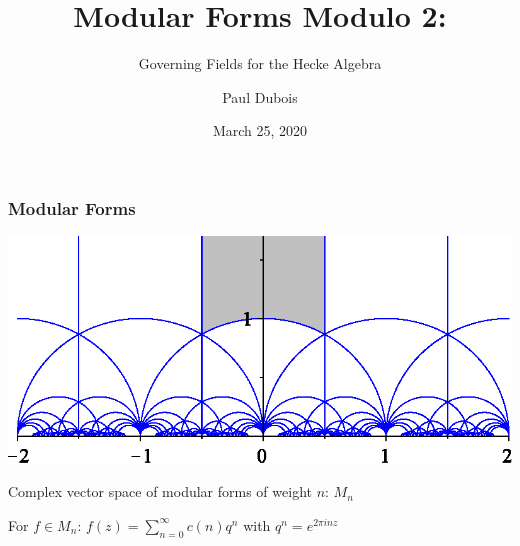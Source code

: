 \documentclass[12pt]{beamer}
\begin{document}
	\author{Paul Dubois}
	\title{Modular Forms Modulo 2:}
	\subtitle{Governing Fields for the Hecke Algebra}
	\date{March 25, 2020}
	\subject{Mathematics}
	\begin{frame}[plain]
		\maketitle
	\end{frame}
	
	\begin{frame}
		\frametitle{Modular Forms}
		\begin{center}
			\includegraphics{ModularGroup-FundamentalDomain.eps}
		\end{center}
		
		Complex vector space of modular forms of weight $n$: $M_n$
		
		\vspace{0.5cm}
		
		For $f \in M_n$: $f(z) = \sum_{n = 0}^{\infty} c(n)q^n$ with $q^n = e^{2\pi i n z}$
	\end{frame}
\end{document}
